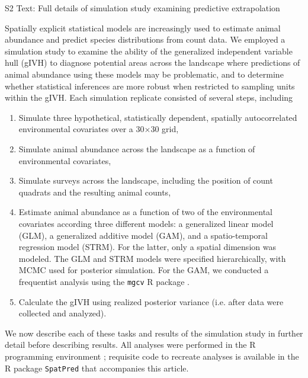\documentclass[12pt,fleqn]{article}
\begin{document}
\rm \begin{flushleft}

\raggedbottom
\vspace{.5in}

\begin{center}
S2 Text: Full details of simulation study examining predictive extrapolation
\bigskip
\end{center}
\vspace{.3in}

\doublespacing

Spatially explicit statistical models are increasingly used to estimate animal abundance and predict species distributions from count data.  We employed a simulation study to examine the ability of the generalized independent variable hull (gIVH) to diagnose potential areas across the landscape where predictions of animal abundance using these models may be problematic, and to determine whether statistical inferences are more robust when restricted to sampling units within the gIVH.  Each simulation replicate consisted of several steps, including
\begin{enumerate}
  \item Simulate three hypothetical, statistically dependent, spatially autocorrelated environmental covariates over a 30$\times$30 grid,
  \item Simulate animal abundance across the landscape as a function of environmental covariates,
  \item Simulate surveys across the landscape, including the position of count quadrats and the resulting animal counts,
  \item Estimate animal abundance as a function of two of the environmental covariates according three different models: a generalized linear model (GLM), a generalized additive model (GAM), and a spatio-temporal regression model (STRM).  For the latter, only a spatial dimension was modeled.  The GLM and STRM models were specified hierarchically, with MCMC used for posterior simulation.  For the GAM, we conducted a frequentist analysis using the \texttt{mgcv} R package \citep{Wood2006}.
  \item Calculate the gIVH using realized posterior variance (i.e. after data were collected and analyzed).
\end{enumerate}
We now describe each of these tasks and results of the simulation study in further detail before describing results.  All analyses were performed in the R programming environment \citep{RTeam2012}; requisite code to recreate analyses is available in the R package \texttt{SpatPred} that accompanies this article.


\end{flushleft}
\end{document}
